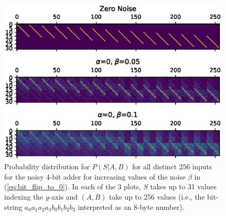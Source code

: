 \begin{figure}
    \includegraphics[width=.95\textwidth]{media/noisy_4bit_adder_value_dist_full.eps}
    \caption{Probability distribution for $P(S|A,B)$ for all distinct 256 inputs for the noisy 4-bit adder for increasing values of the noise $\beta$ in (\ref{eq:bit_flip_to_0}). In each of the 3 plots, $S$ takes up to 31 values indexing the $y$-axis and $(A,B)$ take up to 256 values (i.e., the bit-string $a_0a_1a_2a_3b_0b_1b_2b_3$ interpreted as an 8-byte number). \label{fig:noise_prob_dist_4bit_adder}}
\end{figure}

